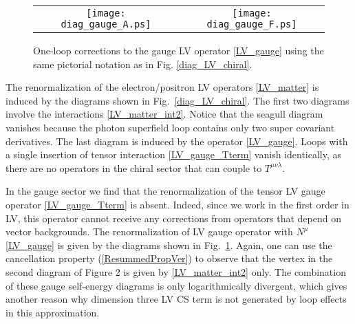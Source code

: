 \documentclass[12pt]{revtex4}
\begin{document}
\begin{figure}
\begin{center}
\begin{tabular}{cc}
\texttt{[image: diag\_gauge\_A.ps]}
&
\texttt{[image: diag\_gauge\_F.ps]}
\end{tabular}
\end{center}
\caption{\label{diag_LV_gauge}
One-loop corrections to the gauge LV operator 
\eqref{LV_gauge} using the same pictorial notation as in Fig. 
\ref{diag_LV_chiral}. 
}
\end{figure}


The renormalization of the electron/positron LV operators
\eqref{LV_matter} is induced by the diagrams shown in 
Fig.~\ref{diag_LV_chiral}. The first two diagrams involve the
interactions \eqref{LV_matter_int2}. Notice that the seagull diagram
vanishes because the photon superfield loop contains only two super
covariant derivatives. The last diagram is induced by the operator  
\eqref{LV_gauge}. Loops with a single insertion of tensor
interaction \eqref{LV_gauge_Tterm} vanish identically, as there are no
operators in the chiral sector that can couple to $T^{\mu\nu\lambda}$. 


In the gauge sector we find that the renormalization of the tensor LV
gauge operator \eqref{LV_gauge_Tterm} is absent. Indeed, since we 
work in the first order in LV, this operator cannot receive any
corrections from operators that depend on vector backgrounds. The
renormalization of LV gauge operator with $N^\mu$ \eqref{LV_gauge} 
is given by the diagrams shown in Fig.~\ref{diag_LV_gauge}. 
Again, one can use the cancellation property (\ref{ResummedPropVer}) 
to observe that the vertex in the second diagram of Figure 2 is given
by \eqref{LV_matter_int2} only. The combination of these gauge
self-energy diagrams is only logarithmically divergent, which gives another reason why
dimension three LV CS term is not generated by loop effects
in this approximation.   
\end{document}
